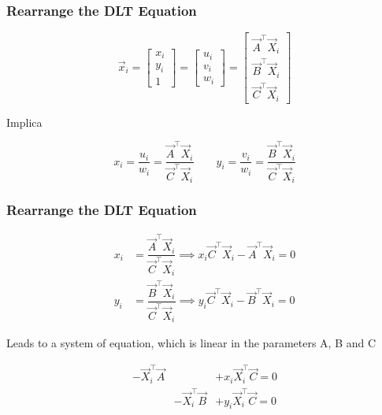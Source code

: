 \begin{frame}
  \frametitle{Rearrange the DLT Equation}

  \begin{equation*}
    \vec{x}_{i} =
    \begin{bmatrix}
      x_{i} \\
      y_{i} \\
      1
    \end{bmatrix} =
    \begin{bmatrix}
      u_{i} \\
      v_{i} \\
      w_{i}
    \end{bmatrix} = 
    \begin{bmatrix}
      \vec{A}^{\top}\vec{X}_{i} \\
      \vec{B}^{\top}\vec{X}_{i} \\
      \vec{C}^{\top}\vec{X}_{i}
    \end{bmatrix}
  \end{equation*}

Implica

  \begin{equation*}
    x_{i} = \dfrac{u_{i}}{w_{i}} = \dfrac{\vec{A}^{\top}\vec{X}_{i}}{\vec{C}^{\top}\vec{X}_{i}}
    \quad \quad
    y_{i} = \dfrac{v_{i}}{w_{i}} = \dfrac{\vec{B}^{\top}\vec{X}_{i}}{\vec{C}^{\top}\vec{X}_{i}}
  \end{equation*}

\end{frame}

\begin{frame}
  \frametitle{Rearrange the DLT Equation}

  \begin{align*}
    x_{i} &= \dfrac{\vec{A}^{\top}\vec{X}_{i}}{\vec{C}^{\top}\vec{X}_{i}} \implies x_{i} \vec{C}^{\top}\vec{X}_{i} - \vec{A}^{\top}\vec{X}_{i} = 0\\
    y_{i} &= \dfrac{\vec{B}^{\top}\vec{X}_{i}}{\vec{C}^{\top}\vec{X}_{i}} \implies y_{i} \vec{C}^{\top}\vec{X}_{i} - \vec{B}^{\top}\vec{X}_{i} = 0
  \end{align*}

  Leads to a system of equation, which is linear in the parameters A, B and C

  \begin{equation*}
    \begin{matrix}
      -\vec{X}_{i}^{\top}\vec{A}& &+x_{i}\vec{X}_{i}^{\top}\vec{C} = 0 \\
      &-\vec{X}_{i}^{\top}\vec{B} &+y_{i}\vec{X}_{i}^{\top}\vec{C} = 0
    \end{matrix}  
  \end{equation*}

\end{frame}

